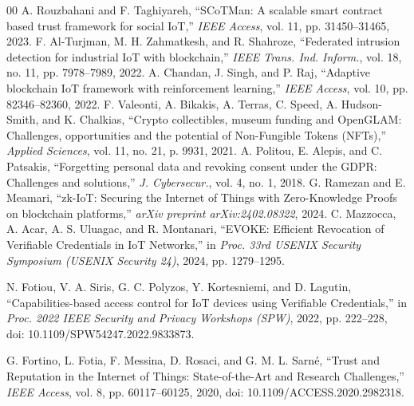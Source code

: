 \documentclass[conference]{IEEEtran}
\begin{document}
\begin{thebibliography}{00}
 A. Rouzbahani and F. Taghiyareh, ``SCoTMan: A scalable smart contract based trust framework for social IoT,'' \textit{IEEE Access}, vol. 11, pp. 31450--31465, 2023.
 F. Al-Turjman, M. H. Zahmatkesh, and R. Shahroze, ``Federated intrusion detection for industrial IoT with blockchain,'' \textit{IEEE Trans. Ind. Inform.}, vol. 18, no. 11, pp. 7978--7989, 2022.
 A. Chandan, J. Singh, and P. Raj, ``Adaptive blockchain IoT framework with reinforcement learning,'' \textit{IEEE Access}, vol. 10, pp. 82346--82360, 2022.
 F. Valeonti, A. Bikakis, A. Terras, C. Speed, A. Hudson-Smith, and K. Chalkias, ``Crypto collectibles, museum funding and OpenGLAM: Challenges, opportunities and the potential of Non-Fungible Tokens (NFTs),'' \textit{Applied Sciences}, vol. 11, no. 21, p. 9931, 2021.
 A. Politou, E. Alepis, and C. Patsakis, ``Forgetting personal data and revoking consent under the GDPR: Challenges and solutions,'' \textit{J. Cybersecur.}, vol. 4, no. 1, 2018.
 G. Ramezan and E. Meamari, ``zk-IoT: Securing the Internet of Things with Zero-Knowledge Proofs on blockchain platforms,'' \textit{arXiv preprint arXiv:2402.08322}, 2024.
 C. Mazzocca, A. Acar, A. S. Uluagac, and R. Montanari, ``EVOKE: Efficient Revocation of Verifiable Credentials in IoT Networks,'' in \textit{Proc. 33rd USENIX Security Symposium (USENIX Security 24)}, 2024, pp. 1279--1295.

 N. Fotiou, V. A. Siris, G. C. Polyzos, Y. Kortesniemi, and D. Lagutin, ``Capabilities-based access control for IoT devices using Verifiable Credentials,'' in \textit{Proc. 2022 IEEE Security and Privacy Workshops (SPW)}, 2022, pp. 222--228, doi: 10.1109/SPW54247.2022.9833873.

 G. Fortino, L. Fotia, F. Messina, D. Rosaci, and G. M. L. Sarn\'{e}, ``Trust and Reputation in the Internet of Things: State-of-the-Art and Research Challenges,'' \textit{IEEE Access}, vol. 8, pp. 60117--60125, 2020, doi: 10.1109/ACCESS.2020.2982318.
\end{thebibliography}
\end{document}
